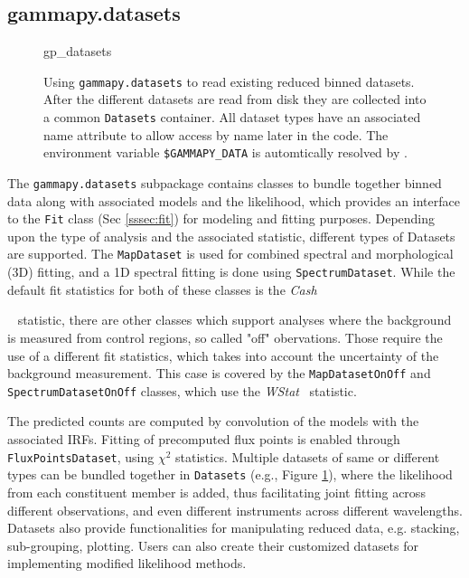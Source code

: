 \documentclass[traditabstract, longauth]{aa}
\newcommand{\code}[1]{\texttt{#1}}
\begin{document}
{\subsection{gammapy.datasets}
\label{ssec:gammapy-datasets}
%
\begin{figure}
	\small
	{gp_datasets}
	\caption{
        Using \code{gammapy.datasets} to read existing reduced binned datasets.
        After the different datasets are read from disk they are collected into a
        common \code{Datasets} container. All dataset types have an associated
        name attribute to allow access by name later in the code. The
        environment variable \code{\$GAMMAPY\_DATA} is automtically resolved
        by \gammapy.
    }
	\label{fig*:minted:gp_datasets}
\end{figure}
%
The \code{gammapy.datasets} subpackage contains classes to bundle
together binned data along with associated models and the likelihood, which
provides an interface to the \code{Fit} class (Sec \ref{sssec:fit}) for
modeling and fitting purposes. Depending upon the type of analysis and the
associated statistic, different types of Datasets are supported. The \code{MapDataset} is
used for combined spectral and morphological (3D) fitting, and a 1D spectral fitting is
done using \code{SpectrumDataset}. While the default fit statistics for both of these
classes is the \emph{Cash}}~\citep{Cash} statistic, there are other classes which support
analyses where the background is measured from control regions, so called "off" obervations.
Those require the use of a different fit statistics, which takes into account the
uncertainty of the background measurement. This case is covered by the \code{MapDatasetOnOff}
and \code{SpectrumDatasetOnOff} classes, which use the \emph{WStat}~\citep{WStat} statistic.

The predicted counts are computed by convolution of the models with the associated
IRFs. Fitting of precomputed flux points is enabled through \code{FluxPointsDataset},
using \emph{$\chi^2$} statistics. Multiple datasets of same or different types can be
bundled together in \code{Datasets} (e.g., Figure \ref{fig*:minted:gp_datasets}),
where the likelihood from each constituent member is added, thus facilitating
joint fitting across different observations, and even different instruments
across different wavelengths. Datasets also provide functionalities for
manipulating reduced data, e.g. stacking, sub-grouping, plotting. Users can
also create their customized datasets for implementing modified likelihood
methods.
\end{document}
